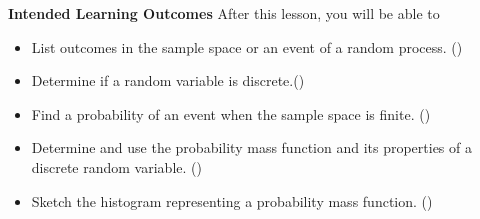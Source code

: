\documentclass[10pt]{article}
\begin{document}
\thispagestyle{firstpage}
\pagestyle{otherpages}



\textbf{Intended Learning Outcomes}
After this lesson, you will be able to 

\begin{itemize}
    \item List outcomes in the sample space or an event of a random process. ()
    \item Determine if a random variable is discrete.()
    \item Find a probability of an event when the sample space is finite. ()
    \item Determine and use the probability mass function and its properties of a discrete random variable. ()
    \item Sketch the histogram representing a probability mass function. ()
\end{itemize}

\vspace{-0.5cm}

\hrulefill

\vspace{0.2cm}

\end{document}
